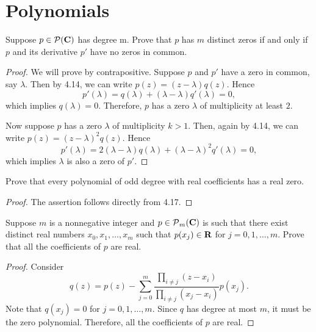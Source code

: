 \chapter{Polynomials}

\begin{exercise}{6}
	Suppose \( p \in \operatorname{\mathcal{P}}(\mathbf{C}) \) has degree m. Prove that \( p \) has \( m \) distinct zeros if
and only if \( p \) and its derivative \( p' \) have no zeros in common.
\end{exercise}

\begin{proof}
	We will prove by contrapositive. Suppose \( p \) and \( p' \) have a zero in common, say \( \lambda \). Then by 4.14, we can write \( p(z) = (z - \lambda)q(z) \). Hence
	\[
		p'(\lambda) = q(\lambda) + (\lambda - \lambda)q'(\lambda) = 0,
	\]
	which implies \( q(\lambda) = 0 \). Therefore, \( p \) has a zero \( \lambda \) of multiplicity at least \( 2 \).

	Now suppose \( p \) has a zero \( \lambda \) of multiplicity \( k > 1 \). Then, again by 4.14, we can write \( p(z) = (z - \lambda)^2q(z) \). Hence
	\[
		p'(\lambda) = 2(\lambda - \lambda)q(\lambda) + (\lambda - \lambda)^2q'(\lambda) = 0,
	\]
	which implies \( \lambda \) is also a zero of \( p' \).
\end{proof}

\begin{exercise}{7}
	Prove that every polynomial of odd degree with real coefficients has a real zero.
\end{exercise}

\begin{proof}
	The assertion follows directly from 4.17.
\end{proof}

\begin{exercise}{10}
	Suppose \( m \) is a nonnegative integer and \( p \in \operatorname{\mathcal{P}}_{m}(\mathbf{C}) \) is such that there exist distinct real numbers \( x_{0}, x_{1}, \ldots, x_{m} \) such that \( p(x_{j}) \in \mathbf{R} \) for \( j = 0, 1, \ldots, m \). Prove that all the coefficients of \( p \) are real.
\end{exercise}

\begin{proof}
	Consider
	\[
		q(z) = p(z) - \sum_{j = 0}^{m} \frac{\prod_{i \neq j} (z - x_{i})}{\prod_{i \neq j} (x_{j} - x_{i})}p(x_{j}).
	\]
	Note that \( q(x_{j}) = 0 \) for \( j = 0, 1, \ldots, m \). Since \( q \) has degree at most \( m \), it must be the zero polynomial. Therefore, all the coefficients of \( p \) are real.
\end{proof}
